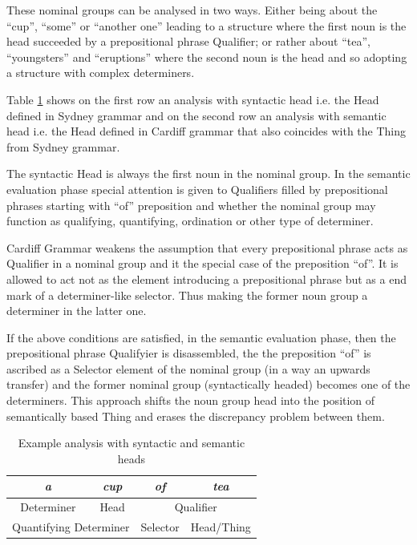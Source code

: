 These nominal groups can be analysed in two ways. Either  being about the ``cup'', ``some'' or ``another one'' leading to a structure where the first noun is the head succeeded by a prepositional phrase Qualifier; or rather about ``tea'', ``youngsters'' and ``eruptions'' where the second noun is the head and so adopting a structure with complex determiners.

Table \ref{tab:exmaple-analisys-parsing-syn-sem-heads} shows on the first row an analysis with syntactic head i.e. the Head defined in Sydney grammar and on the second row an analysis with semantic head i.e. the Head defined in Cardiff grammar that also coincides with the Thing from Sydney grammar.

The syntactic Head is always the first noun in the nominal group. 
In the semantic evaluation phase special attention is given to Qualifiers filled by prepositional phrases starting with ``of'' preposition and whether the nominal group may function as qualifying, quantifying, ordination or other type of determiner. 

Cardiff Grammar weakens the assumption that every prepositional phrase acts as Qualifier in a nominal group and it the special case of the preposition ``of''. It is allowed to act not as the element introducing a prepositional phrase but as a end mark of a determiner-like selector. Thus making the former noun group a determiner in the latter one. 

If the above conditions are satisfied, in the semantic evaluation phase, then the prepositional phrase Qualifyier is disassembled, the the preposition ``of'' is ascribed as a Selector element of the nominal group (in a way an upwards transfer) and the former nominal group (syntactically headed) becomes one of the determiners. This approach shifts the noun group head into the position of semantically based Thing and erases the discrepancy problem between them. 

\begin{table}[!ht]
    \centering
    \begin{tabular}{|c|c|c|c|}
        \hline
        \textit{a} & \textit{cup} & \textit{of} & \textit{tea} \\ \hline
        Determiner & Head & \multicolumn{2}{c|}{Qualifier} \\ \hline
        \multicolumn{2}{|c|}{Quantifying Determiner} & Selector & Head/Thing \\ \hline
    \end{tabular}
    \caption{Example analysis with syntactic and semantic heads}
    \label{tab:exmaple-analisys-parsing-syn-sem-heads}
\end{table}

